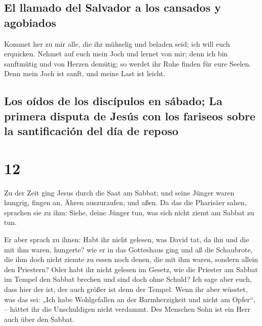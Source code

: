 \hypertarget{el-llamado-del-salvador-a-los-cansados-y-agobiados}{%
\subsection{El llamado del Salvador a los cansados
\hspace{0pt}\hspace{0pt}y
agobiados}\label{el-llamado-del-salvador-a-los-cansados-y-agobiados}}

 Kommet her zu mir alle, die ihr mühselig und beladen
seid; ich will euch erquicken.  Nehmet auf euch mein Joch
und lernet von mir; denn ich bin sanftmütig und von Herzen demütig; so
werdet ihr Ruhe finden für eure Seelen.  Denn mein Joch
ist sanft, und meine Last ist leicht.

\hypertarget{los-ouxeddos-de-los-discuxedpulos-en-suxe1bado-la-primera-disputa-de-jesuxfas-con-los-fariseos-sobre-la-santificaciuxf3n-del-duxeda-de-reposo}{%
\subsection{Los oídos de los discípulos en sábado; La primera disputa de
Jesús con los fariseos sobre la santificación del día de
reposo}\label{los-ouxeddos-de-los-discuxedpulos-en-suxe1bado-la-primera-disputa-de-jesuxfas-con-los-fariseos-sobre-la-santificaciuxf3n-del-duxeda-de-reposo}}

\hypertarget{section-11}{%
\section{12}\label{section-11}}

 Zu der Zeit ging Jesus durch die Saat am Sabbat; und
seine Jünger waren hungrig, fingen an, Ähren auszuraufen, und aßen.
 Da das die Pharisäer sahen, sprachen sie zu ihm: Siehe,
deine Jünger tun, was sich nicht ziemt am Sabbat zu tun.

 Er aber sprach zu ihnen: Habt ihr nicht gelesen, was
David tat, da ihn und die mit ihm waren, hungerte?  wie er
in das Gotteshaus ging und aß die Schaubrote, die ihm doch nicht ziemte
zu essen noch denen, die mit ihm waren, sondern allein den Priestern?
 Oder habt ihr nicht gelesen im Gesetz, wie die Priester
am Sabbat im Tempel den Sabbat brechen und sind doch ohne Schuld?
 Ich sage aber euch, dass hier der ist, der auch größer
ist denn der Tempel.  Wenn ihr aber wüsstet, was das sei:
„Ich habe Wohlgefallen an der Barmherzigkeit und nicht am Opfer``, --
hättet ihr die Unschuldigen nicht verdammt.  Des Menschen
Sohn ist ein Herr auch über den Sabbat.

